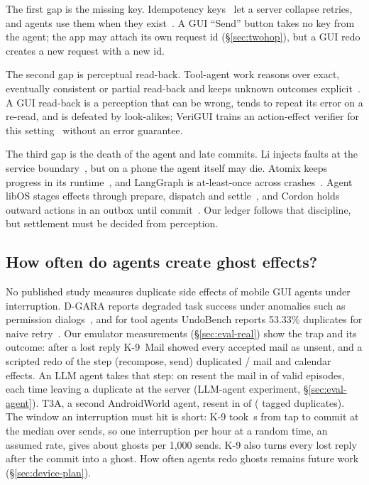 The first gap is the missing key. Idempotency keys~\cite{stripe_idempotency,helland2012idempotence} let a server collapse retries, and agents use them when they exist~\cite{li2026exactlyonce}.
A GUI ``Send'' button takes no key from the agent; the app may attach its own request id (\S\ref{sec:twohop}), but a GUI redo creates a new request with a new id.

The second gap is perceptual read-back. Tool-agent work reasons over exact, eventually consistent or partial read-back and keeps unknown outcomes explicit~\cite{li2026exactlyonce,mansoor2026verified,liu2026retrybench,wang2026callability,zhu2026evidence}. A GUI read-back is a perception that can be wrong, tends to repeat its error on a re-read, and is defeated by look-alikes;
VeriGUI trains an action-effect verifier for this setting~\cite{zhang2026verigui} without an error guarantee.

The third gap is the death of the agent and late commits. Li injects faults at the service boundary~\cite{li2026exactlyonce}, but on a phone the agent itself may die. Atomix keeps progress
in its runtime~\cite{mohammadi2026atomix}, and LangGraph is at-least-once across crashes~\cite{khan2026resume}. Agent libOS stages effects through prepare, dispatch and settle~\cite{zhang2026agentlibos}, and Cordon
holds outward actions in an outbox until commit~\cite{chen2026cordon}. Our ledger follows that discipline, but settlement must be decided from perception.

\subsection{How often do agents create ghost effects?}
\label{sec:measure-teaser}
No published study measures duplicate side effects of mobile GUI agents under interruption. D-GARA reports degraded task success under anomalies such as permission
dialogs~\cite{chen2025dgara}, and for tool agents UndoBench reports 53.33\% duplicates for naive retry~\cite{sah2026undobench}. Our emulator measurements (\S\ref{sec:eval-real}) show the trap and its outcome: after a lost reply K-9~Mail showed every
accepted mail as unsent, and a scripted redo of the step (recompose, send) duplicated \RealGuiDup/\RealGuiN{} mail and calendar effects. An LLM agent takes that step: \AgentFramework{} on \AgentModel{} resent the mail in \AgentResentN{} of \AgentValidN{} valid
episodes, each time leaving a duplicate at the server (LLM-agent experiment, \S\ref{sec:eval-agent}). T3A, a second AndroidWorld agent, resent in
\AgentTextResentN{} of \AgentTextValidN{} (\AgentTextDupN{} tagged duplicates). The window an interruption must hit is short: K-9 took \RealWinKnineMedS\,s from tap to commit at the median over \RealWinKnineN{} sends, so one interruption per hour at a random time, an assumed rate, gives about \RealWinKninePerK{} ghosts per 1{,}000 sends. K-9 also turns every lost reply after the commit into a ghost. How often agents redo ghosts remains future work (\S\ref{sec:device-plan}).

